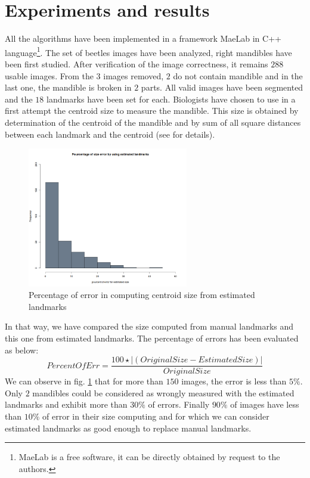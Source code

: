 \documentclass[twoside,twocolumn,10pt]{article}
\begin{document}
\section{Experiments and results}
All the algorithms have been implemented in a framework MaeLab in C++
language\footnote{MaeLab is a free software, it can be directly obtained
 by request to the authors.}. The set of beetles images have
been analyzed, right mandibles have been first studied. After
verification of the image correctness, it remains $288$ usable 
images. From the $3$ images removed, $2$ do not contain mandible and
in the last one, the mandible is broken in $2$ parts. All valid 
images have been segmented and the $18$ landmarks have been set
for each. Biologists have chosen to use in a first attempt the centroid
size to measure the mandible. This size is obtained by determination of the
centroid of the mandible and by sum of all square distances 
between each landmark and the centroid (see \cite{web2010} for
details).
\begin{figure}[h!]
\centering
\includegraphics[width=7cm]{./images/frequency.png}
\caption{\small{Percentage of error in computing centroid size from estimated
landmarks}}
\label{percentage}
\end{figure}

In that way, we have compared the size computed from manual landmarks and this one from estimated
landmarks. The percentage of errors has been evaluated as below: 
\small{
$$
PercentOfErr = \frac{100 \star |(Original Size - Estimated Size)|}{ Original Size}
$$
}
We can observe in fig. \ref{percentage} that for more than $150$ images, the error
is less than $5\% $. Only $2$ mandibles could be considered as wrongly
measured with the estimated landmarks and exhibit more than  $30\% $
of errors. Finally $90\% $ of images have less than $10\% $ of error in
their size computing and for which we can consider estimated landmarks
as good enough to replace manual landmarks.
\end{document}
